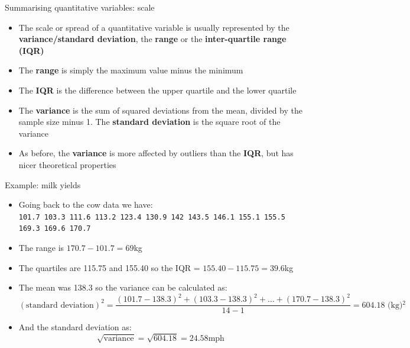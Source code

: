\documentclass[12pt,xcolor=dvipsnames,handout,mathserif,aspectratio=169]{beamer}
\newcommand{\bbl}[1]{{\color{NavyBlue} \textbf{#1}}}
\newcommand{\bre}[1]{{\color{red} \textbf{#1}}}
\newcommand{\bgr}[1]{{\color{PineGreen} \textbf{#1}}}
\begin{document}
\begin{frame}{Summarising quantitative variables: scale }

\begin{itemize}
\item The scale or spread of a quantitative variable is usually represented by the \bbl{variance/standard deviation}, the \bgr{range} or the \bre{inter-quartile range (IQR)}
\pause
\item The \bgr{range} is simply the maximum value minus the minimum
\pause
\item The \bre{IQR} is the difference between the upper quartile and the lower quartile
\pause
\item The \bbl{variance} is the sum of squared deviations from the mean, divided by the sample size minus 1. The \bbl{standard deviation} is the square root of the variance
\pause
\item As before, the \bbl{variance} is more affected by outliers than the \bre{IQR}, but has nicer theoretical properties
\end{itemize}
\pause
\end{frame}

\begin{frame}{ Example: milk yields }

\begin{itemize}
\item Going back to the cow data we have:\\
\texttt{101.7 103.3 111.6 113.2 123.4 130.9 142 143.5 146.1 155.1 155.5 169.3 169.6 170.7}\\

\pause
\item The range is $170.7 - 101.7 = 69$kg
\pause
\item The quartiles are 115.75 and 155.40 so the IQR = $155.40 - 115.75 = 39.6$kg
\pause
\item The mean was 138.3 so the variance can be calculated as:
\scriptsize
$$(\mbox{standard deviation})^{2} = \frac{ (101.7 - 138.3)^{2} + (103.3 - 138.3)^{2} + \ldots + (170.7-138.3)^{2} }{ 14 - 1} = 604.18\mbox{ (kg)$^2$}$$
\normalsize
\pause
\vspace{-0.3cm}
\item And the standard deviation as:
$$\sqrt{\mbox{variance}} = \sqrt{604.18} = 24.58\mbox{mph}$$
\end{itemize}
\end{frame}
\end{document}
